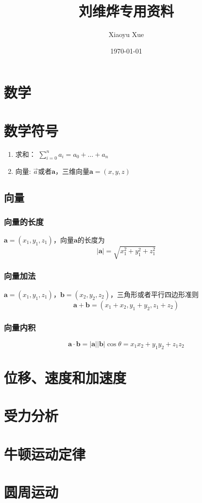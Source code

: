 \documentclass[a4paper,oneside,12pt]{article}
\title{刘维烨专用资料}
\author{Xiaoyu Xue}
\date{\today}
\newcommand{\bol}[1]{\textbf{#1}}
\begin{document}
\maketitle
\section{数学}
\section{数学符号}
\begin{enumerate}
	\item 求和： $\displaystyle \sum_{i = 0} ^ n a_i = a_0 + \ldots + a_n$
	\item 向量: $\vec{a}$或者$\bol{a}$，三维向量$\bol{a} = (x,y,z)$
\end{enumerate}
\subsection{向量}
\subsubsection{向量的长度}
$\bol{a} = (x_1, y_1, z_1)$，向量$\bol{a}$的长度为
\begin{displaymath}
\vert \bol{a} \vert = \sqrt{x_1^2 + y_1^2 + z_1^2}
\end{displaymath}
\subsubsection{向量加法}
$\bol{a} = (x_1, y_1, z_1)$，$\bol{b} = (x_2, y_2, z_2)$，三角形或者平行四边形准则
\begin{displaymath}
\bol{a} + \bol{b} = (x_1 + x_2, y_1 + y_2, z_1 + z_2)
\end{displaymath}
\subsubsection{向量内积}
\begin{displaymath}
\bol{a} \cdot \bol{b} = \vert \bol{a}\vert \vert\bol{b}\vert \cos\theta =x_1x_2 + y_1y_2 + z_1z_2
\end{displaymath}
\section{位移、速度和加速度}
\section{受力分析}
\section{牛顿运动定律}
\section{圆周运动}
\end{document}
